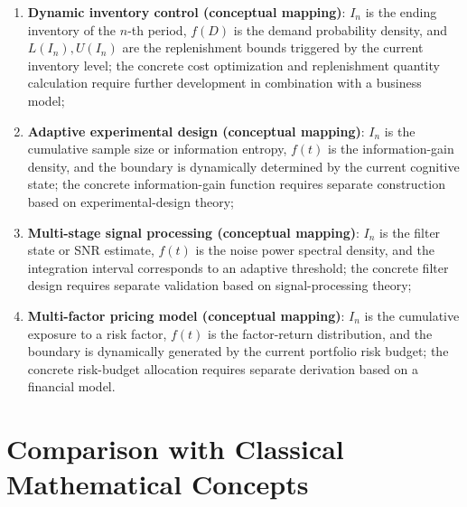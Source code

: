 \documentclass[11pt,a4paper]{amsart}
\begin{document}
\begin{enumerate}
\item \textbf{Dynamic inventory control (conceptual mapping)}: $I_n$ is the ending inventory of the $n$-th period, $f(D)$ is the demand probability density, and $L(I_n), U(I_n)$ are the replenishment bounds triggered by the current inventory level; the concrete cost optimization and replenishment quantity calculation require further development in combination with a business model;
\item \textbf{Adaptive experimental design (conceptual mapping)}: $I_n$ is the cumulative sample size or information entropy, $f(t)$ is the information-gain density, and the boundary is dynamically determined by the current cognitive state; the concrete information-gain function requires separate construction based on experimental-design theory;
\item \textbf{Multi-stage signal processing (conceptual mapping)}: $I_n$ is the filter state or SNR estimate, $f(t)$ is the noise power spectral density, and the integration interval corresponds to an adaptive threshold; the concrete filter design requires separate validation based on signal-processing theory;
\item \textbf{Multi-factor pricing model (conceptual mapping)}: $I_n$ is the cumulative exposure to a risk factor, $f(t)$ is the factor-return distribution, and the boundary is dynamically generated by the current portfolio risk budget; the concrete risk-budget allocation requires separate derivation based on a financial model.
\end{enumerate}

\section{Comparison with Classical Mathematical Concepts}
\end{document}
